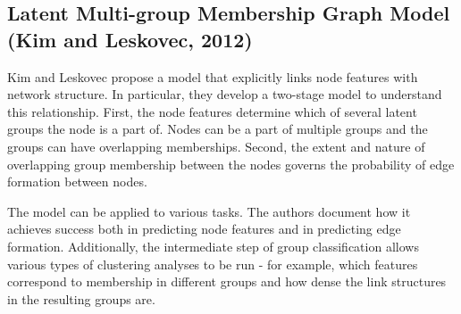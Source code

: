\subsection{Latent Multi-group Membership Graph Model (Kim and Leskovec, 2012)}

Kim and Leskovec propose a model that explicitly links node features with
network structure. In particular, they develop a two-stage model to understand
this relationship. First, the node features determine which of several latent
groups the node is a part of. Nodes can be a part of multiple groups and the
groups can have overlapping memberships. Second, the extent and nature of
overlapping group membership between the nodes governs the probability of edge
formation between nodes.

The model can be applied to various tasks. The authors document how it achieves
success both in predicting node features and in predicting edge formation.
Additionally, the intermediate step of group classification allows various types
of clustering analyses to be run - for example, which features correspond to
membership in different groups and how dense the link structures in the
resulting groups are.
